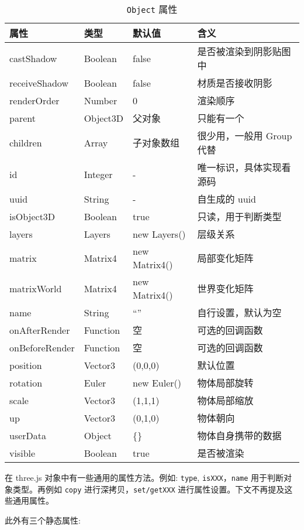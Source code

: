 \begin{table}[H]
  \small
  \centering
  \caption{\texttt{Object} 属性}
  \setlength{\tabcolsep}{4mm}
  \begin{tabular}{l|l|l|l}
    \toprule
    \textbf{属性} & \textbf{类型} & \textbf{默认值} & \textbf{含义} \\
    \midrule
    castShadow & Boolean & false & 是否被渲染到阴影贴图中 \\
    receiveShadow & Boolean & false & 材质是否接收阴影 \\
    renderOrder & Number & 0 & 渲染顺序 \\
    parent & Object3D & 父对象 & 只能有一个 \\
    children & Array & 子对象数组 & 很少用，一般用 Group 代替 \\
    id & Integer & - & 唯一标识，具体实现看源码 \\
    uuid & String & - & 自生成的 uuid \\
    isObject3D  & Boolean & true & 只读，用于判断类型 \\
    layers & Layers & new Layers() & 层级关系 \\
    matrix & Matrix4 & new Matrix4() & 局部变化矩阵 \\
    matrixWorld  & Matrix4 & new Matrix4() & 世界变化矩阵 \\
    name & String & ``'' & 自行设置，默认为空 \\
    onAfterRender & Function & 空 & 可选的回调函数 \\
    onBeforeRender & Function & 空 & 可选的回调函数 \\
    position & Vector3 & (0,0,0) & 默认位置 \\
    rotation & Euler & new Euler() & 物体局部旋转 \\
    scale & Vector3 & (1,1,1) & 物体局部缩放 \\
    up & Vector3 & (0,1,0) & 物体朝向 \\
    userData & Object & \{\} & 物体自身携带的数据 \\
    visible & Boolean & true & 是否被渲染 \\
    \bottomrule
  \end{tabular}
\end{table}

在 three.js 对象中有一些通用的属性方法。例如: \texttt{type}, \texttt{isXXX}，\texttt{name} 用于判断对象类型。再例如 \texttt{copy} 进行深拷贝，\texttt{set/getXXX} 进行属性设置。下文不再提及这些通用属性。

此外有三个静态属性:

